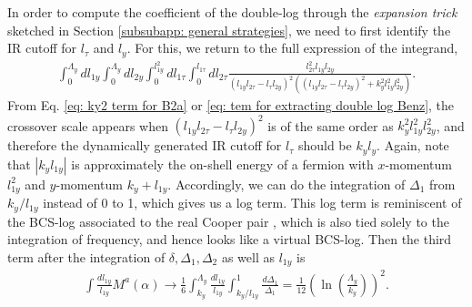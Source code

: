 \documentclass[prx,amsmath,amssymb, notitlepage, onecolumn,
nofootinbib,
superscriptaddress,
longbibliography
]{revtex4-1}
\newcommand{\beq}{\begin{eqnarray}}
\newcommand{\eeq}{\end{eqnarray}}
\begin{document}
In order to compute the coefficient of the double-log through the {\it expansion trick} sketched in Section \ref{subsubapp: general strategies}, we need to first identify the IR cutoff for $l_\tau$
and $l_{y}$. 
For this, we return to the full expression of the integrand,
\beq\label{eq: tem for extracting double log Benz}
\int_0^{\Lambda_y} d l_{1y} \int_0^{\Lambda_y} d l_{2y} \int_0^{l_{1y}^2} d l_{1\tau} \int_0^{l_{1\tau}} d l_{2\tau}\frac{l_{2\tau}^2 l_{1y} l_{2y}}{(l_{1y} l_{2\tau} - l_\tau l_{2y})^2\left((l_{1y} l_{2\tau} - l_\tau l_{2y})^2 + k_y^2 l_{1y}^2 l_{2y}^2\right)}.
\eeq
From Eq. \eqref{eq: ky2 term for B2a} or \eqref{eq: tem for extracting double log Benz}, the crossover scale appears when $(l_{1y} l_{2\tau} - l_\tau l_{2y})^2$ is of the same order as $k_y^2 l_{1y}^2 l_{2y}^2$, and therefore the dynamically generated IR cutoff for $l_\tau$ should be $k_y l_y$. Again, note that $|k_y l_{1y}|$ is approximately the on-shell energy of a fermion with $x$-momentum $l_{1y}^2$ and $y$-momentum $k_y+l_{1y}$. Accordingly, we can do the integration of $\Delta_1$ from $k_y/l_{1y}$ instead of 0 to 1, which gives us a log term. This log term is reminiscent of the BCS-log associated to the real Cooper pair \cite{Polchinski1992,Shankar1994}, which is also tied solely to the integration of frequency, and hence looks like a virtual BCS-log. Then the third term after the integration of $\delta, \Delta_1, \Delta_2$ as well as $l_{1y}$ is 
\beq
\int\frac{d l_{1y}}{l_{1y}}M^a(\alpha) \rightarrow\frac{1}{6}\int_{k_y}^{\Lambda_y}\frac{dl_{1y}}{l_{1y}}\int_{k_y/l_{1y}}^1\frac{d\Delta_1}{\Delta_1}=\frac{1}{12}\left(\ln\left(\frac{\Lambda_y}{k_y}\right)\right)^2.
\label{eq:doublelogexp}
\eeq
\end{document}
